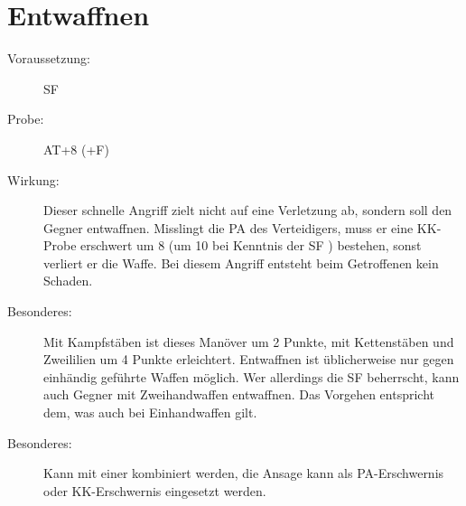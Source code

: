 \section{Entwaffnen}
\label{bAT.entwaffnen}
\begin{description}
    \item[Voraussetzung:]
        SF 
    \item[Probe:]
        AT+8 (+F)
    \item[Wirkung:]
        Dieser schnelle Angriff zielt nicht auf eine Verletzung ab, sondern soll den Gegner entwaffnen.
        Misslingt die PA des Verteidigers, muss er eine KK-Probe erschwert um 8 (um 10 bei Kenntnis der SF ) bestehen, sonst verliert er die Waffe.
        Bei diesem Angriff entsteht beim Getroffenen kein Schaden.
    \item[Besonderes:]
        Mit Kampfstäben ist dieses Manöver um 2 Punkte, mit Kettenstäben und Zweililien um 4 Punkte erleichtert.
        Entwaffnen ist üblicherweise nur gegen einhändig geführte Waffen möglich.
        Wer allerdings die SF  beherrscht, kann auch Gegner mit Zweihandwaffen entwaffnen.
        Das Vorgehen entspricht dem, was auch bei Einhandwaffen gilt.
    \item[Besonderes:]
        Kann mit einer  kombiniert werden, die Ansage kann als PA-Erschwernis oder KK-Erschwernis eingesetzt werden.
\end{description}
